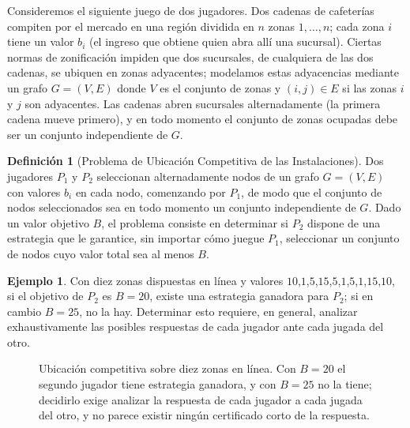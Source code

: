 \documentclass[12pt, spanish, oneside, openany]{book}
\theoremstyle{uprightplain}
\theoremstyle{definition}
\newtheorem{definicion}[teorema]{Definición}
\newtheorem{ejemplo}[teorema]{Ejemplo}
\theoremstyle{remark}
\theoremstyle{definition}
\begin{document}
Consideremos el siguiente juego de dos jugadores. Dos cadenas de cafeterías compiten por el mercado en una región dividida en $n$ zonas $1,\dots,n$; cada zona $i$ tiene un valor $b_i$ (el ingreso que obtiene quien abra allí una sucursal). Ciertas normas de zonificación impiden que dos sucursales, de cualquiera de las dos cadenas, se ubiquen en zonas adyacentes; modelamos estas adyacencias mediante un grafo $G=(V,E)$ donde $V$ es el conjunto de zonas y $(i,j) \in E$ si las zonas $i$ y $j$ son adyacentes. Las cadenas abren sucursales alternadamente (la primera cadena mueve primero), y en todo momento el conjunto de zonas ocupadas debe ser un conjunto independiente de $G$.

\begin{definicion}[Problema de Ubicación Competitiva de las Instalaciones]
\label{def:localizacion-competitiva}
Dos jugadores $P_1$ y $P_2$ seleccionan alternadamente nodos de un grafo $G=(V,E)$ con valores $b_i$ en cada nodo, comenzando por $P_1$, de modo que el conjunto de nodos seleccionados sea en todo momento un conjunto independiente de $G$. Dado un valor objetivo $B$, el problema consiste en determinar si $P_2$ dispone de una estrategia que le garantice, sin importar cómo juegue $P_1$, seleccionar un conjunto de nodos cuyo valor total sea al menos $B$.
\end{definicion}

\begin{ejemplo}
Con diez zonas dispuestas en línea y valores $10$,$1$,$5$,$15$,$5$,$1$,$5$,$1$,$15$,$10$, si el objetivo de $P_2$ es $B=20$, existe una estrategia ganadora para $P_2$; si en cambio $B=25$, no la hay. Determinar esto requiere, en general, analizar exhaustivamente las posibles respuestas de cada jugador ante cada jugada del otro.
\end{ejemplo}
\begin{figure}[H]
\centering
{}
\caption{Ubicación competitiva sobre diez zonas en línea. Con $B=20$ el
segundo jugador tiene estrategia ganadora, y con $B=25$ no la tiene; decidirlo
exige analizar la respuesta de cada jugador a cada jugada del otro, y no
parece existir ningún certificado corto de la respuesta.}
\label{fig:ubicacion-competitiva}
\end{figure}
\end{document}
